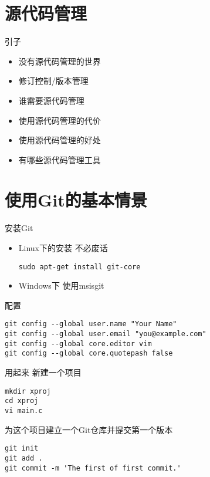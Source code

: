 \iffalse
\part{源代码管理}
\begin{frame}[<+->]{引子}
\begin{itemize}
  \item 没有源代码管理的世界
  \item 修订控制/版本管理
  \item 谁需要源代码管理
  \item 使用源代码管理的代价
  \item 使用源代码管理的好处
  \item 有哪些源代码管理工具
\end{itemize}
\end{frame}

\part{使用Git的基本情景}
\begin{frame}[<+->][fragile]{安装Git}
\begin{itemize}
  \item Linux下的安装
  不必废话
\begin{Verbatim}[frame=single,commandchars=\\\{\}]
sudo apt-get install git-core
\end{Verbatim}

  \item Windows下
  使用msisgit
\end{itemize}
\end{frame}

\begin{frame}[<+->][fragile]{配置}
\begin{Verbatim}[frame=single,commandchars=\\\{\}]
git config --global user.name "Your Name"
git config --global user.email "you@example.com"
git config --global core.editor vim
git config --global core.quotepash false
\end{Verbatim}
\end{frame}

\begin{frame}[<+->][fragile]{用起来}
\onslide<+->
新建一个项目
\begin{Verbatim}[frame=single,commandchars=\\\{\}]
mkdir xproj
cd xproj
vi main.c
\end{Verbatim}

\onslide<+->
为这个项目建立一个Git仓库并提交第一个版本
\begin{Verbatim}[frame=single,commandchars=\\\{\}]
git init
git add .
git commit -m 'The first of first commit.'
\end{Verbatim}
\end{frame}

